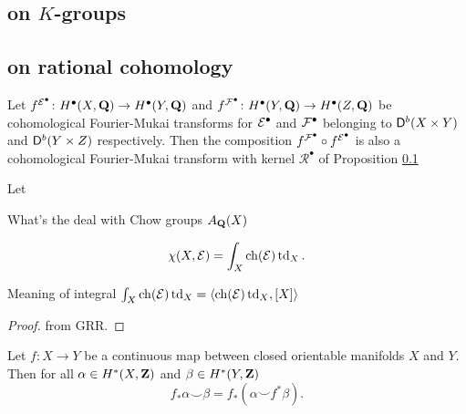 \subsection{on $K$-groups}


\subsection{on rational cohomology}
\label{Subsection: FM transform on cohomology}

\begin{proposition}
    \label{Composition of cohomological fm is fm}
    Let $f^{\mathcal E^\bullet} \colon H^\bullet(X, \mathbf Q) \to H^\bullet(Y, \mathbf Q)$ and $f^{\mathcal F^\bullet} \colon H^\bullet(Y, \mathbf Q) \to H^\bullet(Z, \mathbf Q)$ be cohomological Fourier-Mukai transforms for $\mathcal E^\bullet$ and $\mathcal F^\bullet$ belonging to $\mathsf{D}^b(X \times Y)$ and $\mathsf{D}^b(Y \times Z)$ respectively. Then the composition $f^{\mathcal F^\bullet} \circ f^{\mathcal E^\bullet}$ is also a cohomological Fourier-Mukai transform with kernel $\mathcal R^\bullet$ of Proposition \ref{}
\end{proposition}

\begin{theorem}
    \label{Grothendieck-Riemann-Roch}
    Let
\end{theorem}

\begin{remark}
    What's the deal with Chow groups $A_\mathbf Q(X)$    
\end{remark}

\begin{corollary}
    \label{Hirzebruch-Riemann-Roch}
    \[
        \chi(X, \E) = \int_X \ch{\E}\tdclass{X}.
    \]
\end{corollary}

\begin{remark}
    Meaning of integral $\int_X \ch{\E}\tdclass{X} = \pairing{\ch{\E}\tdclass{X}}{[X]}$
\end{remark}

\begin{proof}
    from GRR.
\end{proof}

\begin{proposition}
    \label{cohomological projection formula}
    Let $f \colon X \to Y$ be a continuous map between closed orientable manifolds $X$ and $Y$. Then for all $\alpha \in H^{*}(X, \mathbf Z)$ and $\beta \in H^{*}(Y, \mathbf Z)$
    \[
        f_*\alpha \smallsmile \beta = f_*(\alpha \smallsmile f^*\beta).
    \]
\end{proposition}

